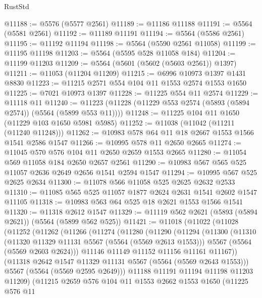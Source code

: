 \begin{lexlean}{RustStd}
\begin{coremodule}
@11188 := @5576 (@5577 @2561)
@11189 := @11186 @11188
@11191 := @5564 (@5581 @2561)
@11192 := @11189 @11191
@11194 := @5564 (@5586 @2561)
@11195 := @11192 @11194
@11198 := @5564 (@5590 @2561 @11058)
@11199 := @11195 @11198
@11203 := @5564 (@5595 @528 @11058 @184)
@11204 := @11199 @11203
@11209 := @5564 (@5601 (@5602 (@5603 @2561)) @1397)
@11211 := @11053 (@11204 @11209)
@11215 := @6996 @10973 @1397 @1431 @8830
@11223 := @11215 @2571 @554 @104 @11 @1553 @2574 @1553 @1650
@11225 := @7021 @10973 @1397
@11228 := @11225 @554 @11 @2574
@11229 := @11118 @11
@11240 := @11223 (@11228 (@11229 @553 @2574 (@5893 (@5894 @2574)) (@5564 (@5899 @553 @11))))
@11248 := @11225 @104 @11 @1650 (@11229 @103 @1650 @5981 @5985)
@11252 := @11038 (@11042 (@11211 (@11240 @11248)))
@11262 := @10983 @578 @64 @11 @18 @2667 @1553 @1566 @1541 @2586 @1547
@11266 := @10995 @578 @11 @2650 @2665
@11274 := @11045 @570 @576 @104 @11 @2650 @2659 @1553 @2665
@11280 := @11054 @569 @11058 @184 @2650 @2657 @2561
@11290 := @10983 @567 @565 @525 @11057 @2636 @2649 @2656 @1541 @2594 @1547
@11294 := @10995 @567 @525 @2625 @2634
@11300 := @11078 @566 @11058 @525 @2625 @2632 @2533
@11310 := @11085 @565 @525 @11057 @1877 @2624 @2631 @1541 @2602 @1547 @11105
@11318 := @10983 @563 @64 @525 @18 @2621 @1553 @1566 @1541
@11320 := @11318 @2612 @1547
@11329 := @11119 @562 @2621 (@5893 (@5894 @2621)) (@5564 (@5899 @562 @525))
@11421 := @11018
    (@11022
      (@11028
        (@11252
          (@11262
            (@11266
              (@11274
                (@11280
                  (@11290
                    (@11294
                      (@11300
                        (@11310
                          (@11320 @11329 @11131 @5567 (@5564 (@5569 @2613 @1553)))
                          @5567
                          (@5564 (@5569 @2603 @2624)))
                        @11146
                        @11149
                        @11152
                        @11156
                        @11161
                        @11167))
                    (@11318 @2642 @1547 @11329 @11131 @5567 (@5564 (@5569 @2643 @1553)))
                    @5567
                    (@5564 (@5569 @2595 @2649)))
                  @11188
                  @11191
                  @11194
                  @11198
                  @11203
                  @11209)
                (@11215
                  @2659
                  @576
                  @104
                  @11
                  @1553
                  @2662
                  @1553
                  @1650
                  (@11225
                    @576
                    @11

\end{coremodule}
\end{lexlean}

